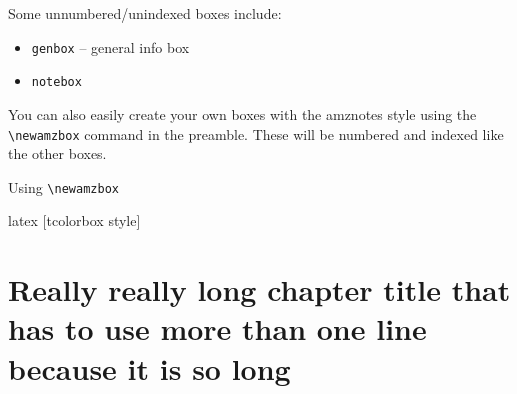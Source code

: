 \documentclass[math,code]{amznotes}
\begin{document}
    Some unnumbered/unindexed boxes include:
    \begin{itemize}[noitemsep]
        \item \texttt{genbox} -- general info box
        \item \texttt{notebox}
    \end{itemize}

    You can also easily create your own boxes with the amznotes style using the \texttt{\textbackslash newamzbox} command in the preamble. These will be numbered and indexed like the other boxes.

    \begin{codebox}{Using \texttt{\textbackslash newamzbox}}{}
        \begin{amzcode}{latex}
            [tcolorbox style]
        \end{amzcode}
    \end{codebox}

    \chapter{Really really long chapter title that has to use more than one line because it is so long}
    \lipsum[100]
    \lipsum[101]

    \lipsum[102]

    \begin{notebox}
        \lipsum[21]
    \end{notebox}

    \lipsum[104]


    \amzindex
\end{document}
